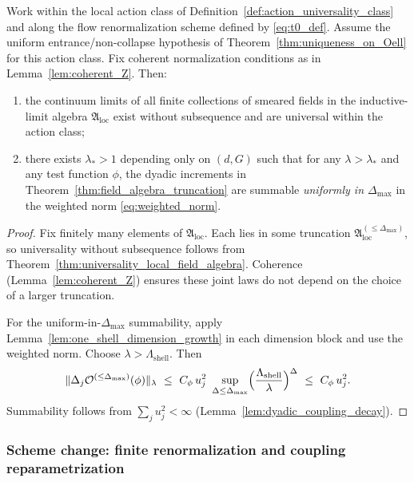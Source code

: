 \begin{theorem}
\label{thm:universality_full_inductive_limit}
Work within the local action class of Definition~\ref{def:action_universality_class} and along the flow renormalization scheme
defined by \eqref{eq:t0_def}.
Assume the uniform entrance/non-collapse hypothesis of Theorem~\ref{thm:uniqueness_on_Oell} for this action class.
Fix coherent normalization conditions as in Lemma~\ref{lem:coherent_Z}.
Then:
\begin{enumerate}[leftmargin=*]
\item the continuum limits of all finite collections of smeared fields in the inductive-limit algebra $\mathfrak A_{\mathrm{loc}}$ exist without
subsequence and are universal within the action class;
\item there exists $\lambda_*>1$ depending only on $(d,G)$ such that for any $\lambda>\lambda_*$ and any test function $\phi$, the dyadic increments
in Theorem~\ref{thm:field_algebra_truncation} are summable \emph{uniformly in $\Delta_{\max}$} in the weighted norm \eqref{eq:weighted_norm}.
\end{enumerate}
\end{theorem}

\begin{proof}
Fix finitely many elements of $\mathfrak A_{\mathrm{loc}}$.
Each lies in some truncation $\mathfrak A_{\mathrm{loc}}^{(\le\Delta_{\max})}$, so universality without subsequence follows from
Theorem~\ref{thm:universality_local_field_algebra}.
Coherence (Lemma~\ref{lem:coherent_Z}) ensures these joint laws do not depend on the choice of a larger truncation.

For the uniform-in-$\Delta_{\max}$ summability, apply Lemma~\ref{lem:one_shell_dimension_growth} in each dimension block and use the weighted norm.
Choose $\lambda>\Lambda_{\mathrm{shell}}$.
Then
\[\|\Delta_j\mathbf{\mathcal O}^{(\le\Delta_{\max})}(\phi)\|_{\lambda}\ \le\ C_{\phi}\,u_j^2\ \sup_{\Delta\le\Delta_{\max}}\Bigl(\frac{\Lambda_{\mathrm{shell}}}{\lambda}\Bigr)^{\Delta}\ \le\ C_{\phi}\,u_j^2.\]
Summability follows from $\sum_j u_j^2<\infty$ (Lemma~\ref{lem:dyadic_coupling_decay}).
\end{proof}

\subsubsection{Scheme change: finite renormalization and coupling reparametrization}

